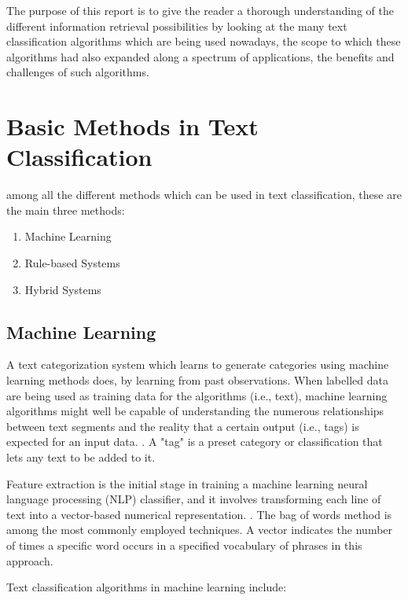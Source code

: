 \documentclass[a4paper]{article}
\begin{document}
The purpose of this report is to give the reader a thorough understanding of the different information retrieval possibilities by looking at the many text classification algorithms which are being used nowadays, the scope to which these algorithms had also expanded along a spectrum of applications, the benefits and challenges of such algorithms.


\section{Basic Methods in Text Classification}
among all the different methods which can be used in text classification, these are the main three methods:
\begin{enumerate}
\item Machine Learning
\item Rule-based Systems
\item Hybrid Systems
\end{enumerate}

\subsection{Machine Learning}
A text categorization system which learns to generate categories using machine learning methods does, by learning from past observations. When labelled data are being used as training data for the algorithms (i.e., text), machine learning algorithms might well be capable of understanding the numerous relationships between text segments and the reality that a certain output (i.e., tags) is expected for an input data. \cite{ES4}. A "tag" is a preset category or classification that lets any text to be added to it.

Feature extraction is the initial stage in training a machine learning neural language processing (NLP) classifier, and it involves transforming each line of text into a vector-based numerical representation. \cite{ES5}. The bag of words method is among the most commonly employed techniques. A vector indicates the number of times a specific word occurs in a specified vocabulary of phrases in this approach.

Text classification algorithms in machine learning include:
\end{document}
